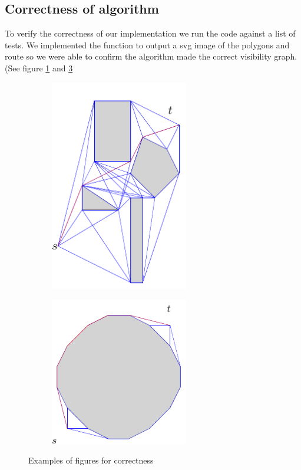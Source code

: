 \subsection{Correctness of algorithm}
To verify the correctness of our implementation we run the code against a list of tests.
We implemented the function to output a svg image of the polygons and route so we
were able to confirm the algorithm made the correct visibility graph. (See
figure \ref{fig:correctness_1} and \ref{fig:correctness_2}
\begin{figure}[H]
	\begin{subfigure}{.5\textwidth}
		\includegraphics[width=6cm]{figures/correctness1.pdf}
		\caption{}
		\label{fig:correctness_1}
	\end{subfigure}
	\begin{subfigure}{.5\textwidth}
		\includegraphics[width=6cm]{figures/correctness2.pdf}
		\caption{}
		\label{fig:correctness_2}
	\end{subfigure}
	\caption{Examples of figures for correctness}
\end{figure}

